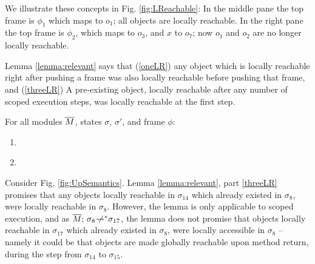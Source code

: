 {We illustrate these concepts in Fig. \ref{fig:LReachable}:  In the middle pane the top frame is $\phi_1$ which maps  to $o_1$; all objects are locally reachable. 
In the right pane the top frame is $\phi_2$, which maps  to $o_3$, and $x$ to $o_7$; now $o_1$ and $o_2$ are no longer locally reachable.

Lemma  \ref{lemma:relevant} %
says that 
(\ref{oneLR}) any object which is locally reachable right after pushing a frame was also locally reachable before pushing that frame, and 
(\ref{threeLR}) A pre-existing object, locally reachable after any number of scoped execution steps, was locally reachable at the first step.

\begin{lemma}
\label{lemma:relevant}
\label{lemma:push:N}
For all modules $\overline{M}$, states $\sigma$, $\sigma'$,   and frame $\phi$:
\begin{enumerate}
\item
\label{oneLR}
\item
\label{threeLR}
\sdN{${\leadstoBoundedStar {\Mtwo}  {\sigma}    {\sigma'}}  \ \  \Longrightarrow\ \ 
dom(\sigma) \cap \LRelevantO {\sigma'} \subseteq   \LRelevantO {\sigma}$
}

\end{enumerate}
\end{lemma}

{Consider Fig.  \ref{fig:UpSemantics}. %
Lemma \ref{lemma:relevant}, part \ref{threeLR}  promises that any objects locally reachable in $\sigma_{14}$ which already existed in $\sigma_{8}$, were locally reachable in $\sigma_{8}$. However, the lemma is only  applicable to scoped execution, and as 
$\overline{M};\, {\sigma_8} \not\!\!\!{\rightsquigarrow^*} \sigma_{17}$, 
the lemma does not promise that  objects locally reachable in $\sigma_{17}$ which already existed in $\sigma_{8}$, were locally accessible in $\sigma_{8}$ -- namely it could be that objects are made globally reachable upon method return, during the step from $\sigma_{14}$ to $\sigma_{15}$.}

 
  
  
  
}
